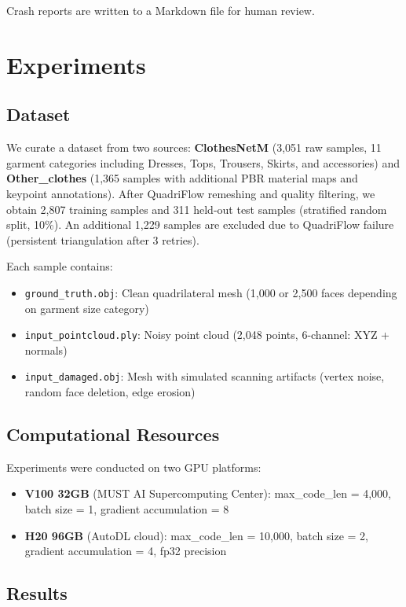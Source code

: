 \documentclass[conference]{IEEEtran}
\begin{document}
Crash reports are written to a Markdown file for human review.

\section{Experiments}

\subsection{Dataset}

We curate a dataset from two sources:
\textbf{ClothesNetM} (3,051 raw samples, 11 garment categories including Dresses, Tops, Trousers, Skirts, and accessories) and \textbf{Other\_clothes} (1,365 samples with additional PBR material maps and keypoint annotations).
After QuadriFlow remeshing and quality filtering, we obtain 2,807 training samples and 311 held-out test samples (stratified random split, 10\%).
An additional 1,229 samples are excluded due to QuadriFlow failure (persistent triangulation after 3 retries).

Each sample contains:
\begin{itemize}
\item \texttt{ground\_truth.obj}: Clean quadrilateral mesh (1,000 or 2,500 faces depending on garment size category)
\item \texttt{input\_pointcloud.ply}: Noisy point cloud (2,048 points, 6-channel: XYZ + normals)
\item \texttt{input\_damaged.obj}: Mesh with simulated scanning artifacts (vertex noise, random face deletion, edge erosion)
\end{itemize}

\subsection{Computational Resources}

Experiments were conducted on two GPU platforms:
\begin{itemize}
\item \textbf{V100 32GB} (MUST AI Supercomputing Center): max\_code\_len = 4,000, batch size = 1, gradient accumulation = 8
\item \textbf{H20 96GB} (AutoDL cloud): max\_code\_len = 10,000, batch size = 2, gradient accumulation = 4, fp32 precision
\end{itemize}

\subsection{Results}
\end{document}
